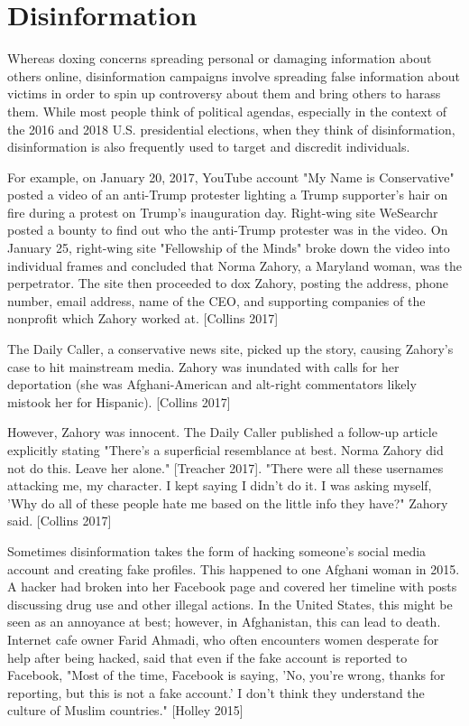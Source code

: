 \documentclass[class=book, crop=false]{standalone}
\begin{document}
\section{Disinformation}

Whereas doxing concerns spreading personal or damaging information about others online, disinformation campaigns involve spreading false information about victims in order to spin up controversy about them and bring others to harass them. While most people think of political agendas, especially in the context of the 2016 and 2018 U.S. presidential elections, when they think of disinformation, disinformation is also frequently used to target and discredit individuals.

For example, on January 20, 2017, YouTube account "My Name is Conservative" posted a video of an anti-Trump protester lighting a Trump supporter's hair on fire during a protest on Trump's inauguration day. Right-wing site WeSearchr posted a bounty to find out who the anti-Trump protester was in the video. On January 25, right-wing site "Fellowship of the Minds" broke down the video into individual frames and concluded that Norma Zahory, a Maryland woman, was the perpetrator. The site then proceeded to dox Zahory, posting the address, phone number, email address, name of the CEO, and supporting companies of the nonprofit which Zahory worked at. [Collins 2017]

The Daily Caller, a conservative news site, picked up the story, causing Zahory's case to hit mainstream media. Zahory was inundated with calls for her deportation (she was Afghani-American and alt-right commentators likely mistook her for Hispanic). [Collins 2017]

However, Zahory was innocent. The Daily Caller published a follow-up article explicitly stating "There's a superficial resemblance at best. Norma Zahory did not do this. Leave her alone." [Treacher 2017]. "There were all these usernames attacking me, my character. I kept saying I didn't do it. I was asking myself, 'Why do all of these people hate me based on the little info they have?" Zahory said. [Collins 2017]

Sometimes disinformation takes the form of hacking someone's social media account and creating fake profiles. This happened to one Afghani woman in 2015. A hacker had broken into her Facebook page and covered her timeline with posts discussing drug use and other illegal actions. In the United States, this might be seen as an annoyance at best; however, in Afghanistan, this can lead to death. Internet cafe owner Farid Ahmadi, who often encounters women desperate for help after being hacked, said that even if the fake account is reported to Facebook, "Most of the time, Facebook is saying, 'No, you're wrong, thanks for reporting, but this is not a fake account.' I don't think they understand the culture of Muslim countries." [Holley 2015]
\end{document}
